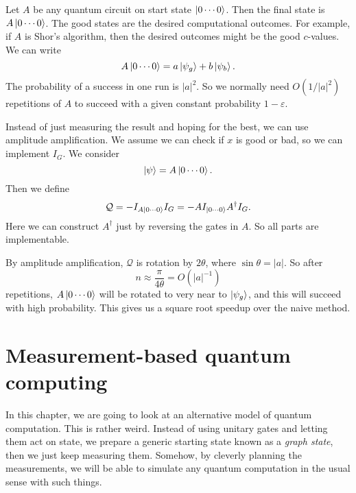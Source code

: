 \begin{eg}
  Let $A$ be any quantum circuit on start state $\left\lvert 0\cdots0\right\rangle$. Then the final state is $A \left\lvert 0\cdots0\right\rangle$. The good states are the desired computational outcomes. For example, if $A$ is Shor's algorithm, then the desired outcomes might be the good $c$-values. We can write
  \[
    A\left\lvert 0\cdots0\right\rangle = a \left\lvert \psi_g\right\rangle + b \left\lvert \psi_b\right\rangle.
  \]
  The probability of a success in one run is $|a|^2$. So we normally need $O(1/|a|^2)$ repetitions of $A$ to succeed with a given constant probability $1 - \varepsilon$.

  Instead of just measuring the result and hoping for the best, we can use amplitude amplification. We assume we can check if $x$ is good or bad, so we can implement $I_G$. We consider
  \[
    \left\lvert \psi\right\rangle = A \left\lvert 0\cdots0\right\rangle.
  \]
  Then we define
  \[
    \mathcal{Q} = - I_{A\left\lvert 0\cdots0\right\rangle} I_G = - A I_{\left\lvert 0\cdots0\right\rangle} A^\dagger I_G.
  \]
  Here we can construct $A^\dagger$ just by reversing the gates in $A$. So all parts are implementable.

  By amplitude amplification, $\mathcal{Q}$ is rotation by $2 \theta$, where $\sin \theta = |a|$. So after
  \[
    n \approx \frac{\pi}{4 \theta} = O(|a|^{-1})
  \]
  repetitions, $A \left\lvert 0\cdots 0\right\rangle$ will be rotated to very near to $\left\lvert \psi_g\right\rangle$, and this will succeed with high probability. This gives us a square root speedup over the naive method.
\end{eg}

\section{Measurement-based quantum computing}
In this chapter, we are going to look at an alternative model of quantum computation. This is rather weird. Instead of using unitary gates and letting them act on state, we prepare a generic starting state known as a \emph{graph state}, then we just keep measuring them. Somehow, by cleverly planning the measurements, we will be able to simulate any quantum computation in the usual sense with such things.

